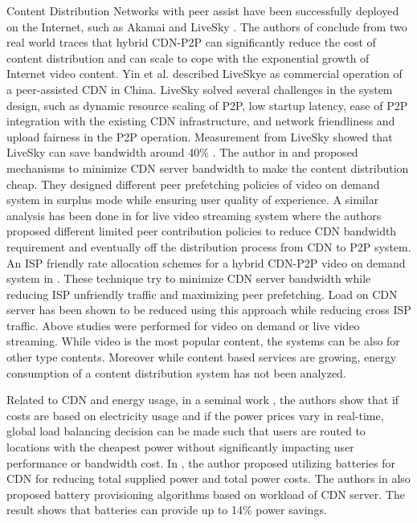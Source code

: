 \documentclass[conference]{IEEEtran}
\begin{document}
Content Distribution Networks with peer assist have been successfully deployed on the Internet, such as Akamai \cite{Huang:2008:UHC:1496046.1496064} and LiveSky \cite{Yin:2010:LEC:1823746.1823750}.  
The authors of \cite{Huang:2008:UHC:1496046.1496064} conclude from two real world traces that hybrid CDN-P2P can significantly reduce the cost of content distribution and can scale to cope with the exponential growth of Internet video content.  
Yin et al. \cite{Yin:2010:LEC:1823746.1823750} described LiveSkye as commercial operation of a peer-assisted CDN in China.  
LiveSky solved several challenges in the system design, such as dynamic resource scaling of P2P, low startup latency, ease of P2P integration with the existing CDN infrastructure, and network friendliness and upload fairness in the P2P operation.  
Measurement from LiveSky showed that LiveSky can save bandwidth around 40\% \cite{Yin:2010:LEC:1823746.1823750}.
The author in \cite{Huang:2007:IVP:1282427.1282396} and \cite{huang2007peer} proposed mechanisms to minimize CDN server bandwidth to make the content distribution cheap.
They designed different peer prefetching policies of video on demand system in surplus mode while ensuring user quality of experience.
A similar analysis has been done in \cite{xu2006analysis} for live video streaming system where the authors proposed different limited peer contribution policies to reduce CDN bandwidth requirement and eventually off the distribution process from CDN to P2P system. 
An ISP friendly rate allocation schemes for a hybrid CDN-P2P video on demand system in \cite{Wang:2008:IRA:1459359.1459397}. 
These technique try to minimize CDN server bandwidth while reducing ISP unfriendly traffic and maximizing peer prefetching.
Load on CDN server has been shown to be reduced using this approach while reducing cross ISP traffic.
Above studies were performed for video on demand or live video streaming.
While video is the most popular content, the systems can be also for other type contents.
Moreover while content based services are growing, energy consumption of a content distribution system has not been analyzed.

Related to CDN and energy usage, in a seminal work \cite{qureshi2009cutting}, the authors show that if costs are based on electricity usage and if the power prices vary in real-time, global load balancing decision can be made such that users are routed to locations with the cheapest power without significantly impacting user performance or bandwidth cost.  
In \cite{Palasamudram:2012:UBR:2391229.2391240}, the author proposed utilizing batteries for CDN for reducing total supplied power and total power costs.
The authors in \cite{Palasamudram:2012:UBR:2391229.2391240} also proposed battery provisioning algorithms based on workload of CDN server. 
The result shows that batteries can provide up to 14\% power savings.
\end{document}

